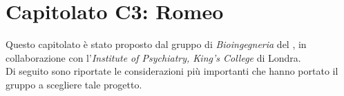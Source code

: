 \section{Capitolato C3: Romeo}
\label{capitolato3}
Questo capitolato è stato proposto dal gruppo di \textit{Bioingegneria} del \proposerName, in collaborazione con l'\textit{Institute of Psychiatry, King's College} di Londra. 
\\Di seguito sono riportate le  considerazioni più  importanti che hanno portato il gruppo a scegliere tale progetto.

